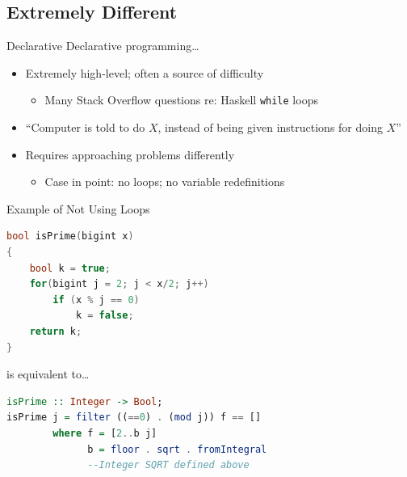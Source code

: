 \documentclass{beamer}
\begin{document}
		\subsection{Extremely Different}
			\begin{frame}{Declarative}
				Declarative programming\dots
				\begin{itemize}
					\item Extremely high-level; often a source of difficulty
					\begin{itemize}
						\item Many Stack Overflow questions re: Haskell
							\texttt{while} loops 
					\end{itemize}
					\item ``Computer is told to do $X$, instead of being given
						instructions for doing $X$''
					\item Requires approaching problems differently
					\begin{itemize}
						\item Case in point: no loops; no variable redefinitions
					\end{itemize}
				\end{itemize}
			\end{frame}
			\begin{frame}[fragile]{Example of Not Using Loops}
				\small
				\begin{lstlisting}[language=C++]
bool isPrime(bigint x)
{
	bool k = true;
	for(bigint j = 2; j < x/2; j++)
		if (x % j == 0)
			k = false;
	return k;
}
				\end{lstlisting}
				is equivalent to\dots
				\begin{lstlisting}[language=Haskell]
isPrime :: Integer -> Bool;
isPrime j = filter ((==0) . (mod j)) f == []
        where f = [2..b j]
              b = floor . sqrt . fromIntegral
              --Integer SQRT defined above
				\end{lstlisting}
			\end{frame}
\end{document}

